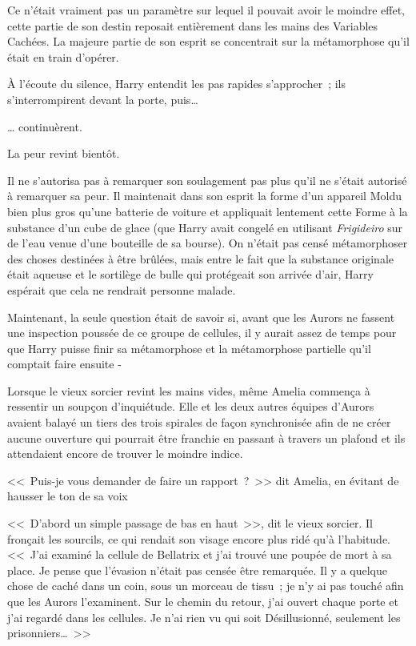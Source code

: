 Ce n'était vraiment pas un paramètre sur lequel il pouvait avoir le moindre effet, cette partie de son destin reposait entièrement dans les mains des Variables Cachées. La majeure partie de son esprit se concentrait sur la métamorphose qu'il était en train d'opérer.

À l'écoute du silence, Harry entendit les pas rapides s'approcher~; ils s'interrompirent devant la porte, puis…

… continuèrent.

La peur revint bientôt.

Il ne s'autorisa pas à remarquer son soulagement pas plus qu'il ne s'était autorisé à remarquer sa peur. Il maintenait dans son esprit la forme d'un appareil Moldu bien plus gros qu'une batterie de voiture et appliquait lentement cette Forme à la substance d'un cube de glace (que Harry avait congelé en utilisant \emph{Frigideiro} sur de l'eau venue d'une bouteille de sa bourse). On n'était pas censé métamorphoser des choses destinées à être brûlées, mais entre le fait que la substance originale était aqueuse et le sortilège de bulle qui protégeait son arrivée d'air, Harry espérait que cela ne rendrait personne malade.

Maintenant, la seule question était de savoir si, avant que les Aurors ne fassent une inspection poussée de ce groupe de cellules, il y aurait assez de temps pour que Harry puisse finir sa métamorphose et la métamorphose partielle qu'il comptait faire ensuite -

\later

Lorsque le vieux sorcier revint les mains vides, même Amelia commença à ressentir un soupçon d'inquiétude. Elle et les deux autres équipes d'Aurors avaient balayé un tiers des trois spirales de façon synchronisée afin de ne créer aucune ouverture qui pourrait être franchie en passant à travers un plafond et ils attendaient encore de trouver le moindre indice.

<<~Puis-je vous demander de faire un rapport~?~>> dit Amelia, en évitant de hausser le ton de sa voix

<<~D'abord un simple passage de bas en haut~>>, dit le vieux sorcier. Il fronçait les sourcils, ce qui rendait son visage encore plus ridé qu'à l'habitude. <<~J'ai examiné la cellule de Bellatrix et j'ai trouvé une poupée de mort à sa place. Je pense que l'évasion n'était pas censée être remarquée. Il y a quelque chose de caché dans un coin, sous un morceau de tissu~; je n'y ai pas touché afin que les Aurors l'examinent. Sur le chemin du retour, j'ai ouvert chaque porte et j'ai regardé dans les cellules. Je n'ai rien vu qui soit Désillusionné, seulement les prisonniers…~>>

